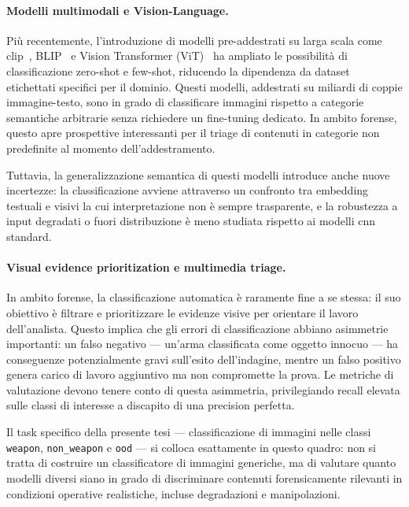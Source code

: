 \paragraph{Modelli multimodali e Vision-Language.}
Più recentemente, l'introduzione di modelli pre-addestrati su larga scala come \gls{clip}~\cite{radford2021learning}, BLIP~\cite{li2022blip} e Vision Transformer (ViT)~\cite{dosovitskiy2020image} ha ampliato le possibilità di classificazione zero-shot e few-shot, riducendo la dipendenza da dataset etichettati specifici per il dominio. Questi modelli, addestrati su miliardi di coppie immagine-testo, sono in grado di classificare immagini rispetto a categorie semantiche arbitrarie senza richiedere un fine-tuning dedicato. In ambito forense, questo apre prospettive interessanti per il triage di contenuti in categorie non predefinite al momento dell'addestramento.

Tuttavia, la generalizzazione semantica di questi modelli introduce anche nuove incertezze: la classificazione avviene attraverso un confronto tra embedding testuali e visivi la cui interpretazione non è sempre trasparente, e la robustezza a input degradati o fuori distribuzione è meno studiata rispetto ai modelli \gls{cnn} standard.

\paragraph{Visual evidence prioritization e multimedia triage.}
In ambito forense, la classificazione automatica è raramente fine a se stessa: il suo obiettivo è filtrare e prioritizzare le evidenze visive per orientare il lavoro dell'analista. Questo implica che gli errori di classificazione abbiano asimmetrie importanti: un falso negativo — un'arma classificata come oggetto innocuo — ha conseguenze potenzialmente gravi sull'esito dell'indagine, mentre un falso positivo genera carico di lavoro aggiuntivo ma non compromette la prova. Le metriche di valutazione devono tenere conto di questa asimmetria, privilegiando recall elevata sulle classi di interesse a discapito di una precision perfetta.

Il task specifico della presente tesi — classificazione di immagini nelle classi \texttt{weapon}, \texttt{non\_weapon} e \texttt{\gls{ood}} — si colloca esattamente in questo quadro: non si tratta di costruire un classificatore di immagini generiche, ma di valutare quanto modelli diversi siano in grado di discriminare contenuti forensicamente rilevanti in condizioni operative realistiche, incluse degradazioni e manipolazioni.


